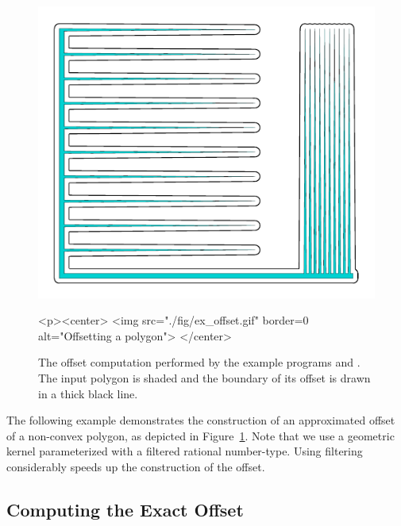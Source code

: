 \begin{figure}[t]
\begin{ccTexOnly}
  \begin{center}
    \includegraphics{Minkowski_sum_2/fig/ex_offset} 
  \end{center}
\end{ccTexOnly}
\begin{ccHtmlOnly}
  <p><center>
  <img src="./fig/ex_offset.gif" border=0 alt="Offsetting a polygon">
  </center>
\end{ccHtmlOnly}
\caption{The offset computation performed by the example programs
 and . The input polygon
is shaded and the boundary of its offset is drawn in a thick black line.}
\label{mink_fig:ex_offset}
\end{figure}

The following example demonstrates the construction of an approximated
offset of a non-convex polygon, as depicted in
Figure~\ref{mink_fig:ex_offset}. Note that we use a geometric kernel
parameterized with a filtered rational number-type. Using filtering
considerably speeds up the construction of the offset.


\subsection{Computing the Exact Offset\label{mink_ssec:exact_offset}}

